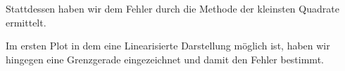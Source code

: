 \documentclass[a4paper,german,12pt,smallheadings]{scrartcl}
\begin{document}
Stattdessen haben wir dem Fehler durch die Methode der kleinsten Quadrate
ermittelt.

Im ersten Plot in dem eine Linearisierte Darstellung möglich ist, haben wir
hingegen eine Grenzgerade eingezeichnet und damit den Fehler bestimmt.

\newpage
\label{plot:57-lin}
\begin{landscape}
  
\end{landscape}




\end{document}
